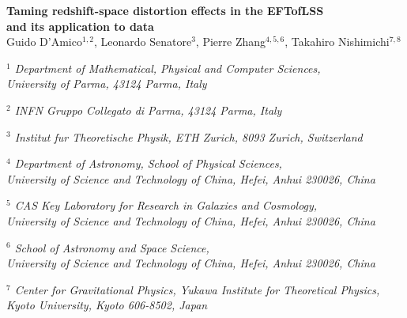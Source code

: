 \documentclass[12pt,a4paper]{article}
\renewcommand{\(}{\left(}
\renewcommand{\)}{\right)}
\begin{document}
\begin{center}

{\Large \bf {Taming redshift-space distortion effects in the EFTofLSS\\[0.3cm] and its application to data}
}
\\[0.7cm]

{\large Guido D'Amico${}^{1,2}$, Leonardo Senatore${}^{3}$, Pierre Zhang${}^{4,5,6}$, Takahiro Nishimichi${}^{7,8}$
\\[0.7cm]}
\end{center}



\begin{center}

\vspace{.0cm}

{\normalsize { \sl $^{1}$ Department of Mathematical, Physical and Computer Sciences,\\ University of Parma, 43124 Parma, Italy}}\\
\vspace{.3cm}

{\normalsize { \sl $^{2}$ INFN Gruppo Collegato di Parma, 43124 Parma, Italy}}\\
\vspace{.3cm}


{\normalsize { \sl $^{3}$ Institut fur Theoretische Physik, ETH Zurich,
8093 Zurich, Switzerland}}\\
\vspace{.3cm}

{\normalsize { \sl $^{4}$ Department of Astronomy, School of Physical Sciences, \\
University of Science and Technology of China, Hefei, Anhui 230026, China}}\\
\vspace{.3cm}

{\normalsize { \sl $^{5}$ CAS Key Laboratory for Research in Galaxies and Cosmology, \\
University of Science and Technology of China, Hefei, Anhui 230026, China}}\\
\vspace{.3cm}

{\normalsize { \sl $^{6}$ School of Astronomy and Space Science, \\
University of Science and Technology of China, Hefei, Anhui 230026, China}}\\
\vspace{.3cm}

{\normalsize { \sl $^{7}$ Center for Gravitational Physics, Yukawa Institute for Theoretical Physics, \\
Kyoto University, Kyoto 606-8502, Japan }}\\
\vspace{.3cm}


\end{center}
\end{document}
